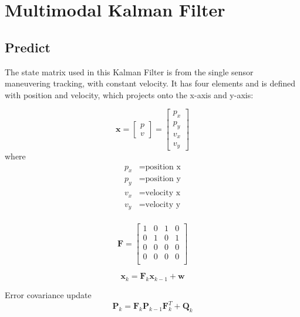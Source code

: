 \section{Multimodal Kalman Filter}\label{sec:2-kalman_filter}
\subsection{Predict}\label{sec:2-predict}
The state matrix used in this Kalman Filter is from the single sensor maneuvering tracking, with constant velocity.
It has four elements and is defined with position and velocity, which projects onto the x-axis and y-axis:

\begin{equation}\label{equ:state_eq}
    \mathbf{x} = 
        \begin{bmatrix} 
        p \\ 
        v 
        \end{bmatrix} = 
        \begin{bmatrix} 
        p_x \\ 
        p_y \\ 
        v_x \\ 
        v_y 
        \end{bmatrix}
\end{equation}
where
\begin{align*}
    p_x &=\text{position x}\\
    p_y &=\text{position y}\\
    v_x &=\text{velocity x}\\
    v_y &=\text{velocity y}\\
\end{align*}

\begin{equation}\label{equ:transition_matrix_H}
    \mathbf{F} = 
    \begin{bmatrix}
        1 & 0 & 1 & 0 \\
        0 & 1 & 0 & 1 \\
        0 & 0 & 0 & 0 \\
        0 & 0 & 0 & 0 \\
      \end{bmatrix}
\end{equation}

\begin{equation}\label{equ:predict_eq}
    \mathbf{x}_k=\mathbf{F}_k\mathbf{x}_{k-1}+\mathbf{w}
\end{equation}

Error covariance update
\begin{equation}\label{equ:error_covariance}
    \mathbf{P}_k=\mathbf{F}_k \mathbf{P}_{k-1} \mathbf{F}_k^T+\mathbf{Q}_k
\end{equation}

